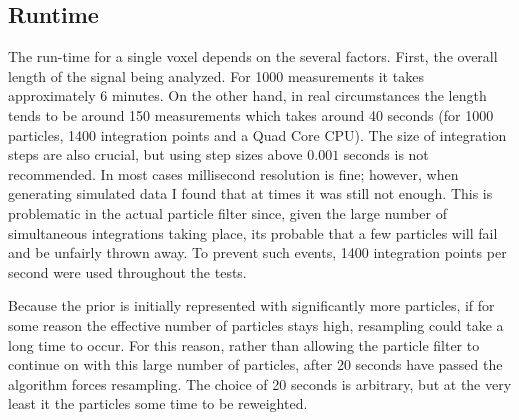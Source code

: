 \subsection{Runtime}
The run-time for a single voxel depends on the several factors. First, the
overall length of the signal being analyzed. For 1000 measurements it takes
approximately 6 minutes. On the other hand, in real circumstances the
length tends to be around 150 measurements which takes around 40 seconds (for 1000 
particles, 1400 integration points and a Quad Core CPU). The size of 
integration steps are also crucial, but using step sizes above 
$0.001$ seconds is not recommended. In most cases millisecond resolution
is fine; however, when generating simulated data I found that at times it was
still not enough. This is problematic in the actual particle
filter since, given the large number of simultaneous integrations taking 
place, its probable that a few particles will fail and be unfairly thrown away.
To prevent such events, 1400 integration points per second were used throughout
the tests. 

Because the prior is initially represented with significantly more
particles, if for some reason the effective
number of particles stays high, resampling could take a long time to occur.
For this reason, rather than allowing the particle filter to continue on 
with this large number of particles, after 20 seconds have passed the
algorithm forces resampling. The choice of 20 seconds is 
arbitrary, but at the very least it the particles some time to be reweighted. 

